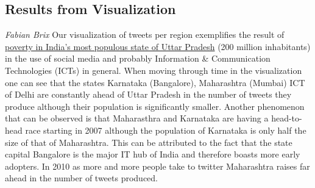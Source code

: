 \subsection*{Results from Visualization}
\emph{Fabian Brix}
Our visualization of tweets per region exemplifies the result of \href{http://web.worldbank.org/WBSITE/EXTERNAL/TOPICS/EXTPOVERTY/EXTPA/0,,contentMDK:20208963~menuPK:435735~pagePK:148956~piPK:216618~theSitePK:430367,00.html}{poverty in India's most populous state of Uttar Pradesh} (200 million inhabitants) in the use of social media and probably Information \& Communication Technologies (ICTs) in general. When moving through time in the visualization one can see that the states Karnataka (Bangalore), Maharashtra (Mumbai) ICT of Delhi are constantly ahead of Uttar Pradesh in the number of tweets they produce although their population is significantly smaller. Another phenomenon that can be observed is that Maharasthra and Karnataka are having a head-to-head race starting in 2007 although the population of Karnataka is only half the size of that of Maharashtra. This can be attributed to the fact that the state capital Bangalore is the major IT hub of India and therefore boasts more early adopters. In 2010 as more and more people take to twitter Maharashtra raises far ahead in the number of tweets produced.
